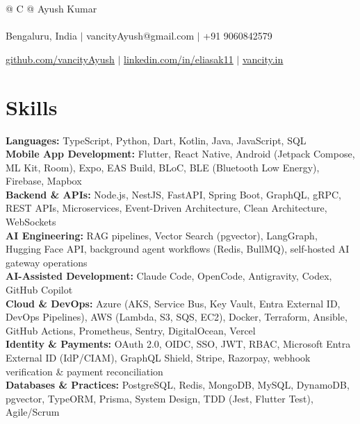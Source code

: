 \documentclass[a4paper,8pt]{article}
\begin{document}
\pagestyle{empty}


\begin{tabularx}{\linewidth}{@{} C @{}}
\color[HTML]{1C033C} \Huge{Ayush Kumar} \\[6pt]
\\
\textcolor[HTML]{371e77}{{{{\faMapMarker} Bengaluru, India}} $|$}
\textcolor[HTML]{371e77}{{{{\faEnvelope} vancityAyush@gmail.com}} $|$}
\textcolor[HTML]{371e77}{{{\faMobile} +91 9060842579}}

\textcolor[HTML]{371e77}{\underline{\href{https://github.com/vancityAyush}{\raisebox{-0.05\height}{\faGithub} github.com/vancityAyush}} $|$}
\textcolor[HTML]{371e77}{\underline{\href{https://linkedin.com/in/eliasak11}{\raisebox{-0.05\height}{\faLinkedin} linkedin.com/in/eliasak11}} $|$}
\textcolor[HTML]{371e77}{\underline{\href{https://vancity.in}{\raisebox{-0.05\height}{\faGlobe} vancity.in}}}
\end{tabularx}

\section{Skills}
\color[HTML]{1C033C}\textbf{Languages:} TypeScript, Python, Dart, Kotlin, Java, JavaScript, SQL\\[3pt]
\color[HTML]{1C033C}\textbf{Mobile App Development:} Flutter, React Native, Android (Jetpack Compose, ML Kit, Room), Expo, EAS Build, BLoC, BLE (Bluetooth Low Energy), Firebase, Mapbox\\[3pt]
\color[HTML]{1C033C}\textbf{Backend \& APIs:} Node.js, NestJS, FastAPI, Spring Boot, GraphQL, gRPC, REST APIs, Microservices, Event-Driven Architecture, Clean Architecture, WebSockets\\[3pt]
\color[HTML]{1C033C}\textbf{AI Engineering:} RAG pipelines, Vector Search (pgvector), LangGraph, Hugging Face API, background agent workflows (Redis, BullMQ), self-hosted AI gateway operations\\[3pt]
\color[HTML]{1C033C}\textbf{AI-Assisted Development:} Claude Code, OpenCode, Antigravity, Codex, GitHub Copilot\\[3pt]
\color[HTML]{1C033C}\textbf{Cloud \& DevOps:} Azure (AKS, Service Bus, Key Vault, Entra External ID, DevOps Pipelines), AWS (Lambda, S3, SQS, EC2), Docker, Terraform, Ansible, GitHub Actions, Prometheus, Sentry, DigitalOcean, Vercel\\[3pt]
\color[HTML]{1C033C}\textbf{Identity \& Payments:} OAuth 2.0, OIDC, SSO, JWT, RBAC, Microsoft Entra External ID (IdP/CIAM), GraphQL Shield, Stripe, Razorpay, webhook verification \& payment reconciliation\\[3pt]
\color[HTML]{1C033C}\textbf{Databases \& Practices:} PostgreSQL, Redis, MongoDB, MySQL, DynamoDB, pgvector, TypeORM, Prisma, System Design, TDD (Jest, Flutter Test), Agile/Scrum\\[3pt]
\end{document}
